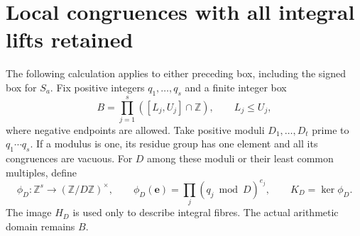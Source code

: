 \documentclass[11pt]{article}
\theoremstyle{definition}\newtheorem{definition}[theorem]{Definition}
\theoremstyle{remark}\newtheorem{remark}[theorem]{Remark}
\newcommand{\Z}{\mathbb Z}\newcommand{\Q}{\mathbb Q}
\begin{document}



\section{Local congruences with all integral lifts retained}

The following calculation applies to either preceding box, including
the signed box for \(S_a\).  Fix positive integers \(q_1,\ldots,q_s\)
and a finite integer box
\[
 B=\prod_{j=1}^s([L_j,U_j]\cap\Z),\qquad L_j\le U_j,
\]
where negative endpoints are allowed.  Take positive moduli
\(D_1,\ldots,D_t\) prime to \(q_1\cdots q_s\).  If a modulus is one,
its residue group has one element and all its congruences are
vacuous.  For \(D\) among these moduli or their least common
multiples, define
\[
 \phi_D:\Z^s\longrightarrow(\Z/D\Z)^\times,\qquad
 \phi_D(\boldsymbol e)=\prod_j(q_j\bmod D)^{e_j},\qquad
 K_D=\ker\phi_D .
\]
The image \(H_D\) is used only to describe integral fibres.  The
actual arithmetic domain remains \(B\).
\end{document}
